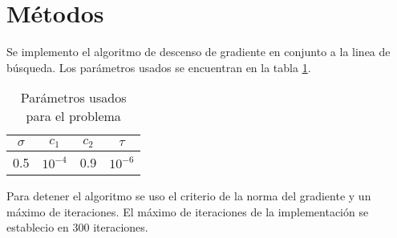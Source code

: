 \section*{Métodos}

Se implemento el algoritmo de descenso de gradiente en conjunto a la linea de búsqueda. Los parámetros usados se encuentran en la tabla \ref{table:parameters}.

\begin{table}[H]
    \centering
    \begin{tabular}{cccc}\hline
        $\sigma$ & $c_1$     & $c_2$ & $\tau$    \\  \hline
        0.5      & $10^{-4}$ & 0.9   & $10^{-6}$ \\ \hline
    \end{tabular}
    \caption{Parámetros usados para el problema}
    \label{table:parameters}
\end{table}

Para detener el algoritmo se uso el criterio de la norma del gradiente y un máximo de iteraciones. El máximo de iteraciones de la implementación se establecio en 300 iteraciones.